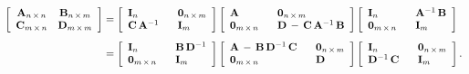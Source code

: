 \documentclass[graybox,envcountchap,sectrefs]{svmono}\usepackage[]{graphicx}\usepackage[]{xcolor}
\begin{document}
\begin{appendices}
\begin{subequations}
\begin{align}
\left[\begin{array}{cc}
\mathrm{\mathbf{A}}_{n\,\times\,n} & \mathrm{\mathbf{B}}_{n\,\times\,m}\\
\mathrm{\mathbf{C}}_{m\,\times\,n} & \mathrm{\mathbf{D}}_{m\,\times\,m}
\end{array}\right] & =\left[\begin{array}{ll}
\mathrm{\mathbf{I}}_{n} & \hphantom{-}\mathrm{\mathbf{0}}_{n\,\times\,m}\\
\mathrm{\mathbf{C}\,}\mathrm{\mathbf{A}}^{-1} & \hphantom{-}\mathrm{\mathbf{I}}_{m}
\end{array}\right]\left[\begin{array}{ll}
\mathrm{\mathbf{A}} & \hphantom{-}\mathrm{\mathbf{0}}_{n\,\times\,m}\\
\mathrm{\mathbf{0}}_{m\,\times\,n} & \mathrm{\hphantom{-}\mathbf{D}}\,-\,\mathrm{\mathbf{C}}\,\mathrm{\mathbf{A}}^{-1}\,\mathrm{\mathbf{B}}
\end{array}\right]\left[\begin{array}{ll}
\mathrm{\mathbf{I}}_{n} & \hphantom{-}\mathrm{\mathbf{A}}^{-1}\,\mathrm{\mathbf{B}}\\
\mathrm{\mathbf{0}}_{m\,\times\,n} & \hphantom{-}\mathrm{\mathbf{I}}_{m}
\end{array}\right]\label{eq:SpecialInverse4a}\\[0.5em]
 & =\left[\begin{array}{ll}
\mathrm{\mathbf{I}}_{n} & \hphantom{-}\mathrm{\mathbf{B}}\,\mathrm{\mathbf{D}}^{-1}\\
\mathrm{\mathbf{0}}_{m\,\times\,n} & \hphantom{-}\mathrm{\mathbf{I}}_{m}
\end{array}\right]\left[\begin{array}{ll}
\mathrm{\mathbf{A}\,-\,\mathrm{\mathbf{B}}\,\mathrm{\mathbf{D}}^{-1}\,\mathrm{\mathbf{C}}} & \hphantom{-}\mathrm{\mathbf{0}}_{n\,\times\,m}\\
\mathrm{\mathbf{0}}_{m\,\times\,n} & \hphantom{-}\mathbf{D}
\end{array}\right]\left[\begin{array}{ll}
\mathrm{\mathbf{I}}_{n} & \hphantom{-}\mathrm{\mathbf{0}}_{n\,\times\,m}\\
\mathrm{\mathbf{D}}^{-1}\,\mathrm{\mathbf{C}} & \hphantom{-}\mathrm{\mathbf{I}}_{m}
\end{array}\right].\label{eq:SpecialInverse4b}
\end{align}
\end{subequations}


\end{appendices}
\end{document}
